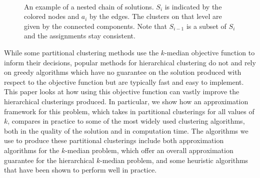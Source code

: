 \documentclass[conference, 10pt, final]{IEEEtran}
\begin{document}
\begin{figure}[b]
\centering
{} \hspace{15mm}
 \\
  \hspace{15mm}
\caption{An example of a nested chain of solutions. $S_i$ is indicated by the colored nodes and $a_i$ by the edges. The clusters on that level are given by the connected components. Note that $S_{i-1}$ is a subset of $S_i$ and the assignments stay consistent. }
\label{fig_sim}
\end{figure}

While some partitional clustering methods use the $k$-median objective function to inform their decisions, popular methods for hierarchical clustering do not and rely on greedy algorithms which have no guarantee on the solution produced with respect to the objective function but are typically fast and easy to implement. This paper looks at how using this objective function can vastly improve the hierarchical clusterings produced. 
In particular, we show how an approximation framework for this problem, which takes in partitional clusterings for all values of $k$, compares in practice to some of the most widely used clustering algorithms, both in the quality of the solution and in computation time. The algorithms we use to produce these partitional clusterings include both approximation algorithms for the $k$-median problem, which offer an overall approximation guarantee for the hierarchical $k$-median problem, and some heuristic algorithms that have been shown to perform well in practice. 
\end{document}
